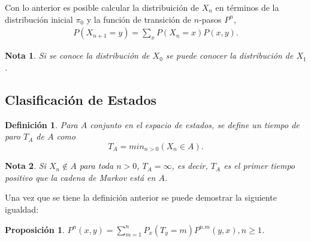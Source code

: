 \documentclass{article}
\newtheorem{Def}{Definición}[section]
\newtheorem{Note}{Nota}[section]
\newtheorem{Prop}{Proposición}[section]
\numberwithin{equation}{section}
\begin{document}
Con lo anterior es posible calcular la distribuici\'on de $X_{n}$ en t\'erminos de la distribuci\'on inicial $\pi_{0}$ y la funci\'on de transici\'on de $n$-pasos $P^{n}$,
\begin{eqnarray}
P\left(X_{n+1}=y\right)=\sum_{x} P\left(X_{n}=x\right)P\left(x,y\right).
\end{eqnarray}
\begin{Note}
Si se conoce la distribuci\'on de $X_{0}$ se puede conocer la distribuci\'on de $X_{1}$.
\end{Note}

\subsection{Clasificaci\'on de Estados}

\begin{Def}
Para $A$ conjunto en el espacio de estados, se define un tiempo de paro $T_{A}$ de $A$ como
\begin{equation}
T_{A}=min_{n>0}\left(X_{n}\in A\right).
\end{equation}
\end{Def}

\begin{Note}
Si $X_{n}\notin A$ para toda $n>0$, $T_{A}=\infty$, es decir,  $T_{A}$ es el primer tiempo positivo que la cadena de Markov est\'a en $A$.
\end{Note}

Una vez que se tiene la definici\'on anterior se puede demostrar la siguiente igualdad:

\begin{Prop}
$P^{n}\left(x,y\right)=\sum_{m=1}^{n}P_{x}\left(T_{y}=m\right)P^{n.m}\left(y,x\right), n\geq1$.
\end{Prop}
\medskip
\end{document}
